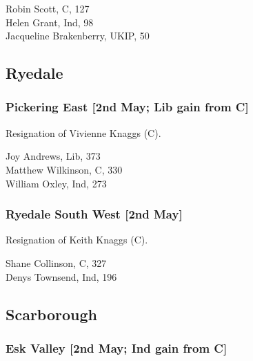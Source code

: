 \documentclass[a4paper,openany,10pt]{book}
\begin{document}
Robin Scott, C, 127\\
Helen Grant, Ind, 98\\
{Jacqueline Brakenberry}, UKIP, 50\\


\subsection*{Ryedale}

\subsubsection*{Pickering East \hspace*{\fill}\nolinebreak[1]%
\enspace\hspace*{\fill}
[2nd May; Lib gain from C]}


Resignation of Vivienne Knaggs (C).



Joy Andrews, Lib, 373\\
Matthew Wilkinson, C, 330\\
William Oxley, Ind, 273\\


\subsubsection*{Ryedale South West \hspace*{\fill}\nolinebreak[1]%
\enspace\hspace*{\fill}
[2nd May]}


Resignation of Keith Knaggs (C).



Shane Collinson, C, 327\\
Denys Townsend, Ind, 196\\


\subsection*{Scarborough}

\subsubsection*{Esk Valley \hspace*{\fill}\nolinebreak[1]%
\enspace\hspace*{\fill}
[2nd May; Ind gain from C]}
\end{document}
